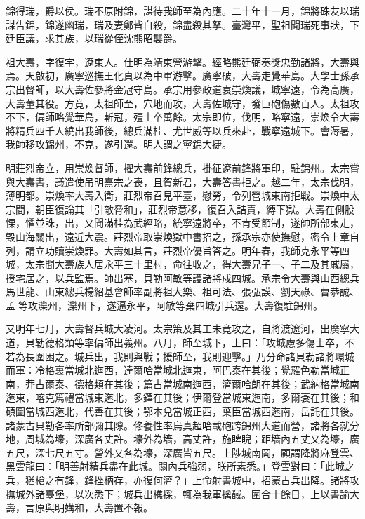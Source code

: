 \begin{pinyinscope}
錦得瑞，爵以侯。瑞不原附錦，謀待我師至為內應。二十年十一月，錦將硃友以瑞謀告錦，錦遂幽瑞，瑞及妻鄭皆自殺，錦盡殺其拏。臺灣平，聖祖聞瑞死事狀，下廷臣議，求其族，以瑞從侄沈熊昭襲爵。

祖大壽，字復宇，遼東人。仕明為靖東營游擊。經略熊廷弼奏獎忠勤諸將，大壽與焉。天啟初，廣寧巡撫王化貞以為中軍游擊。廣寧破，大壽走覺華島。大學士孫承宗出督師，以大壽佐參將金冠守島。承宗用參政道袁崇煥議，城寧遠，令為高廣，大壽董其役。方竟，太祖師至，穴地而攻，大壽佐城守，發巨砲傷數百人。太祖攻不下，偏師略覺華島，斬冠，殪士卒萬餘。太宗即位，伐明，略寧遠，崇煥令大壽將精兵四千人繞出我師後，總兵滿桂、尤世威等以兵來赴，戰寧遠城下。會溽暑，我師移攻錦州，不克，遂引還。明人謂之寧錦大捷。

明莊烈帝立，用崇煥督師，擢大壽前鋒總兵，掛征遼前鋒將軍印，駐錦州。太宗嘗與大壽書，議遣使吊明熹宗之喪，且賀新君，大壽答書拒之。越二年，太宗伐明，薄明都。崇煥率大壽入衛，莊烈帝召見平臺，慰勞，令列營城東南拒戰。崇煥中太宗間，朝臣復論其「引敵脅和」，莊烈帝意移，復召入詰責，縛下獄。大壽在側股慄，懼並誅，出，又聞滿桂為武經略，統寧遠將卒，不肯受節制，遂帥所部東走，毀山海關出，遠近大震。莊烈帝取崇煥獄中書招之，孫承宗亦使撫慰，密令上章自列，請立功贖崇煥罪。大壽如其言，莊烈帝優旨答之。明年春，我師克永平等四城，太宗聞大壽族人居永平三十里村，命往收之，得大壽兄子一、子二及其戚屬，授宅居之，以兵監焉。師出塞，貝勒阿敏等護諸將戍四城。承宗令大壽與山西總兵馬世龍、山東總兵楊紹基會師率副將祖大樂、祖可法、張弘謨、劉天祿、曹恭誠、孟等攻灤州，灤州下，遂逼永平，阿敏等棄四城引兵還。大壽復駐錦州。

又明年七月，大壽督兵城大凌河。太宗策及其工未竟攻之，自將渡遼河，出廣寧大道，貝勒德格類等率偏師出義州。八月，師至城下，上曰：「攻城慮多傷士卒，不若為長圍困之。城兵出，我則與戰；援師至，我則迎擊。」乃分命諸貝勒諸將環城而軍：冷格裏當城北迤西，達爾哈當城北迤東，阿巴泰在其後；覺羅色勒當城正南，莽古爾泰、德格類在其後；篇古當城南迤西，濟爾哈朗在其後；武納格當城南迤東，喀克篤禮當城東迤北，多鐸在其後；伊爾登當城東迤南，多爾袞在其後；和碩圖當城西迤北，代善在其後；鄂本兌當城正西，葉臣當城西迤南，岳託在其後。諸蒙古貝勒各率所部彌其隙。佟養性率烏真超哈載砲跨錦州大道而營，諸將各就分地，周城為壕，深廣各丈許。壕外為墻，高丈許，施睥睨；距墻內五丈又為壕，廣五尺，深七尺五寸。營外又各為壕，深廣皆五尺。上陟城南岡，顧謂降將麻登雲、黑雲龍曰：「明善射精兵盡在此城。關內兵強弱，朕所素悉。」登雲對曰：「此城之兵，猶槍之有鋒，鋒挫柄存，亦復何濟？」上命射書城中，招蒙古兵出降。諸將攻撫城外諸臺堡，以次悉下；城兵出樵採，輒為我軍擒馘。圍合十餘日，上以書諭大壽，言原與明媾和，大壽置不報。


\end{pinyinscope}
